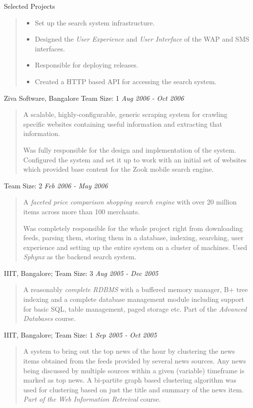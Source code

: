 \documentclass{resume}
\newcommand{\period}{\hfill\small\sl}
\newcommand{\teamsize}{\sc\footnotesize Team Size: }
\begin{document}
\begin{category}{Selected Projects}
\begin{quotation}
        \begin{itemize}
            \item Set up the search system infrastructure.
            \item Designed the {\em User Experience} and {\em User Interface} of the WAP and SMS interfaces.
            \item Responsible for deploying releases.
            \item Created a HTTP based API for accessing the search system.
        \end{itemize}
    \end{quotation}

     Ziva Software, Bangalore {\teamsize 1} {\period Aug 2006 - Oct 2006}
    \begin{quotation}
        A scalable, highly-configurable, generic scraping system for crawling specific websites containing useful information and extracting that information.

        Was fully responsible for the design and implementation of the system. Configured the system and set it up to work with an initial set of websites which provided base content for the Zook mobile search engine.
    \end{quotation}

     {\teamsize 2} {\period Feb 2006 - May 2006}
    \begin{quotation}
        A {\em faceted price comparison shopping search engine} with over 20 million items across more than 100 merchants.

        Was completely responsible for the whole project right from downloading feeds, parsing them, storing them in a database, indexing, searching, user experience and setting up the entire system on a cluster of machines. Used {\em Sphynx} as the backend search system.
    \end{quotation}

     IIIT, Bangalore; {\teamsize 3} {\period Aug 2005 - Dec 2005}
    \begin{quotation}
        A reasonably {\em complete RDBMS} with a buffered memory manager, B+ tree indexing and a complete database management module including support for basic SQL, table management, paged storage etc. Part of the {\em Advanced Databases} course.
    \end{quotation}

     IIIT, Bangalore; {\teamsize 1} {\period Sep 2005 - Oct 2005}
    \begin{quotation}
        A system to bring out the top news of the hour by clustering the news items obtained from the feeds provided by several news sources. Any news being discussed by multiple sources within a given (variable) timeframe is marked as top news. A bi-partite graph based clustering algorithm was used for clustering based on just the title and summary of the news item. {\em Part of the Web Information Retreival} course.
    \end{quotation}


\end{category}
\end{document}
